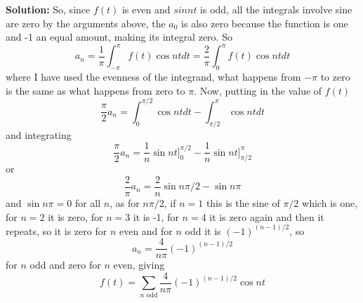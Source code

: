 \documentclass[12pt]{article}
\begin{document}
\begin{enumerate}
\textbf{Solution: } So, since $f(t)$ is even and $sin{nt}$ is odd, all the integrals involve sine are zero by the arguments above, the $a_0$ is also zero because the function is one and -1 an equal amount, making its integral zero. So
\begin{equation}
a_n=\frac{1}{\pi}\int_{-\pi}^\pi f(t)\cos{nt}dt=\frac{2}{\pi}\int_0^\pi f(t)\cos{nt}dt
\end{equation}
where I have used the evenness of the integrand, what happens from
$-\pi$ to zero is the same as what happens from zero to $\pi$. Now,
putting in the value of $f(t)$
\begin{equation}
\frac{\pi}{2}a_n=\int_0^{\pi/2}\cos{nt}dt-\int_{\pi/2}^\pi\cos{nt}dt
\end{equation}
and integrating
\begin{equation}
\frac{\pi}{2}a_n=\frac{1}{n}\sin{nt}]_0^{\pi/2}-\frac{1}{n}\sin{nt}]_{\pi/2}^\pi
\end{equation}
or
\begin{equation}
\frac{2}{\pi}a_n=\frac{2}{n}\sin{n\pi/2}-\sin{n\pi}
\end{equation}
and $\sin{n\pi}=0$ for all $n$, as for $n\pi/2$, if $n=1$ this is the sine of $\pi/2$ which is one, for $n=2$ it is zero, for $n=3$ it is -1, for $n=4$ it is zero again and then it repeats, so it is zero for $n$ even and for $n$ odd it is $(-1)^{(n-1)/2}$, so
\begin{equation}
a_n=\frac{4}{n\pi}(-1)^{(n-1)/2}
\end{equation}
for $n$ odd and zero for $n$ even, giving
\begin{equation}
f(t)=\sum_{n\mbox{ odd}}\frac{4}{n\pi}(-1)^{(n-1)/2}\cos{nt}
\end{equation}



\end{enumerate}
\end{document}
